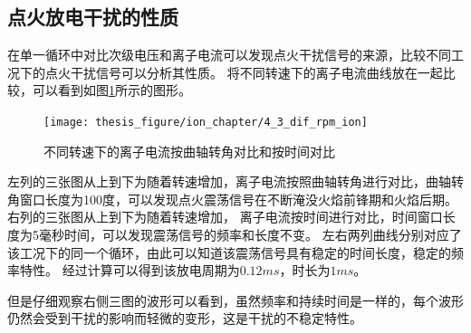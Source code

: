 \subsection{点火放电干扰的性质}
在单一循环中对比次级电压和离子电流可以发现点火干扰信号的来源，比较不同工况下的点火干扰信号可以分析其性质。
将不同转速下的离子电流曲线放在一起比较，可以看到如图\ref{fig:4_3_dif_rpm_ion}所示的图形。\par
\begin{figure}[htb]
	\centering
	\texttt{[image: thesis\_figure/ion\_chapter/4\_3\_dif\_rpm\_ion]}
	\caption{不同转速下的离子电流按曲轴转角对比和按时间对比}
	\label{fig:4_3_dif_rpm_ion}
\end{figure}
左列的三张图从上到下为随着转速增加，离子电流按照曲轴转角进行对比，曲轴转角窗口长度为100度，可以发现点火震荡信号在不断淹没火焰前锋期和火焰后期。右列的三张图从上到下为随着转速增加，
离子电流按时间进行对比，时间窗口长度为5毫秒时间，可以发现震荡信号的频率和长度不变。
左右两列曲线分别对应了该工况下的同一个循环，由此可以知道该震荡信号具有稳定的时间长度，稳定的频率特性。
经过计算可以得到该放电周期为$0.12ms$，时长为$1ms$。\par
但是仔细观察右侧三图的波形可以看到，虽然频率和持续时间是一样的，每个波形仍然会受到干扰的影响而轻微的变形，这是干扰的不稳定特性。
